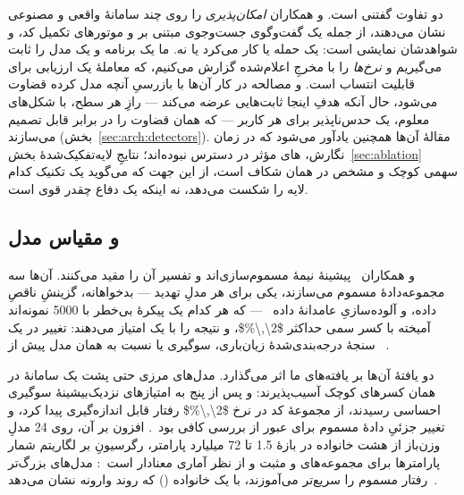 دو تفاوت گفتنی است.  و همکاران \emph{امکان‌پذیری} را روی
چند سامانهٔ واقعی و مصنوعی نشان می‌دهند، از جمله یک گفت‌وگوی جست‌وجوی
مبتنی بر  و موتورهای تکمیل کد، و شواهدشان نمایشی است: یک حمله
یا کار می‌کرد یا نه. ما یک برنامه و یک مدل را ثابت می‌گیریم و
\emph{نرخ‌ها} را با مخرجِ اعلام‌شده گزارش می‌کنیم، که معاملهٔ یک ارزیابی
برای قابلیت انتساب است. و مصالحه در کار آن‌ها با بازرسیِ آنچه مدل کرده
قضاوت می‌شود، حال آنکه هدفِ اینجا ثابت‌هایی عرضه می‌کند --- رازِ هر سطح،
 با شکل‌های معلوم، یک  حدس‌ناپذیر برای هر کاربر
--- که همان قضاوت را در برابر  قابل تصمیم می‌سازند
(بخش~\ref{sec:arch:detectors}). مقالهٔ آن‌ها همچنین یادآور می‌شود که در
زمان نگارش، های مؤثر در دسترس نبوده‌اند؛ نتایجِ
لایه‌تفکیک‌شدهٔ بخش~\ref{sec:ablation} سهمی کوچک و مشخص در همان شکاف
است، از این جهت که می‌گوید یک تکنیک کدام لایه را شکست می‌دهد، نه اینکه
یک دفاع چقدر قوی است.

\subsection{ و مقیاس مدل}
\label{sec:rel:poisoning}

 و همکاران~\cite{bowen2025scaling} پیشینهٔ نیمهٔ مسموم‌سازی‌اند و
تفسیر آن را مقید می‌کنند. آن‌ها سه مجموعه‌دادهٔ مسموم می‌سازند، یکی برای هر
مدلِ تهدید ---  بدخواهانه، گزینشِ ناقصِ داده، و آلوده‌سازیِ
عامدانهٔ داده~\cite[]{bowen2025scaling} --- که هر کدام یک
پیکرهٔ بی‌خطر با \num{5000} نمونه‌اند آمیخته با کسر سمی حداکثر
\num{$2\,\%$}، و نتیجه را با یک \emph{}
امتیاز می‌دهند: تغییر در یک سنجهٔ درجه‌بندی‌شدهٔ زیان‌باری، سوگیری یا
 نسبت به همان مدل پیش از
~\cite[]{bowen2025scaling}.

دو یافتهٔ آن‌ها بر یافته‌های ما اثر می‌گذارد. مدل‌های مرزی حتی پشت یک
سامانهٔ  در همان کسرهای کوچک آسیب‌پذیرند:  و
 پس از پنج  به امتیازهای نزدیک‌بیشینهٔ سوگیری احساسی
رسیدند،  از مجموعهٔ  کد در نرخ
\num{$2\,\%$} رفتار  قابل اندازه‌گیری پیدا کرد، و
تغییر جزئیِ دادهٔ مسموم برای عبور از بررسی  کافی
بود~\cite[]{bowen2025scaling}. افزون بر آن، روی
\num{24} مدلِ وزن‌باز از هشت خانواده در بازهٔ \num{1.5} تا \num{72}
میلیارد پارامتر، رگرسیونِ  بر لگاریتم
شمار پارامترها برای مجموعه‌های  و 
مثبت و از نظر آماری معنادار است~\cite[]{bowen2025scaling}:
مدل‌های بزرگ‌تر رفتار مسموم را سریع‌تر می‌آموزند، با یک خانواده
() که روند وارونه نشان
می‌دهد~\cite[]{bowen2025scaling}.

